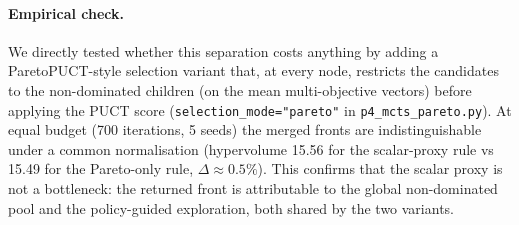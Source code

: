 \documentclass[10pt,a4paper]{article}
\begin{document}
\paragraph{Empirical check.} We directly tested whether this separation costs
anything by adding a ParetoPUCT-style selection variant that, at every node,
restricts the candidates to the non-dominated children (on the mean
multi-objective vectors) before applying the PUCT score
(\texttt{selection\_mode="pareto"} in \texttt{p4\_mcts\_pareto.py}). At equal
budget (\num{700} iterations, \num{5} seeds) the merged fronts are
indistinguishable under a common normalisation (hypervolume \num{15.56} for the
scalar-proxy rule vs \num{15.49} for the Pareto-only rule, $\Delta \approx
\num{0.5}\%$). This confirms that the scalar proxy is not a bottleneck: the
returned front is attributable to the global non-dominated pool and the
policy-guided exploration, both shared by the two variants.
\end{document}
